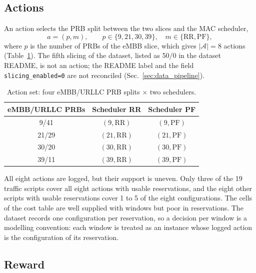 \subsection{Actions}
\label{sec:actions}

An action selects the PRB split between the two slices and the MAC scheduler,
\begin{equation}
  a=(p,m),\qquad p\in\{9,21,30,39\},\quad m\in\{\mathrm{RR},\mathrm{PF}\},
  \label{eq:action}
\end{equation}%
where $p$ is the number of PRBs of the eMBB slice, which gives $|\mathcal{A}|=8$ actions (Table~\ref{tab:actions}).%
The fifth slicing of the dataset, listed as 50/0 in the dataset README, is not an action; the README label and the field \texttt{slicing\_enabled=0} are not reconciled (Sec.~\ref{sec:data_pipeline}).%

\begin{table}[t]
\centering
\caption{Action set: four eMBB/URLLC PRB splits $\times$ two schedulers.}
\label{tab:actions}
\begin{tabular}{ccc}
\hline
eMBB/URLLC PRBs & Scheduler RR & Scheduler PF \\
\hline
9/41  & $(9,\mathrm{RR})$  & $(9,\mathrm{PF})$ \\
21/29 & $(21,\mathrm{RR})$ & $(21,\mathrm{PF})$ \\
30/20 & $(30,\mathrm{RR})$ & $(30,\mathrm{PF})$ \\
39/11 & $(39,\mathrm{RR})$ & $(39,\mathrm{PF})$ \\
\hline
\end{tabular}
\end{table}%

All eight actions are logged, but their support is uneven.%
Only three of the 19 traffic scripts cover all eight actions with usable reservations, and the eight other scripts with usable reservations cover 1 to 5 of the eight configurations.%
The cells of the cost table are well supplied with windows but poor in reservations.%
The dataset records one configuration per reservation, so a decision per window is a modelling convention: each window is treated as an instance whose logged action is the configuration of its reservation.%

\subsection{Reward}
\label{sec:reward}

